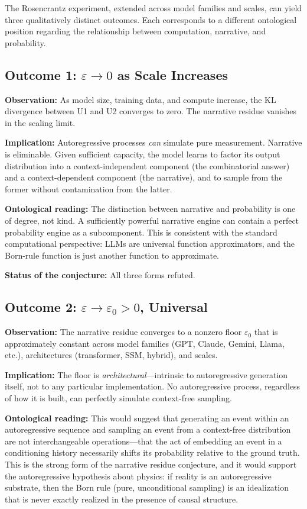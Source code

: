 \documentclass[12pt,a4paper]{article}
\theoremstyle{definition}
\theoremstyle{remark}
\begin{document}
The Rosencrantz experiment, extended across model families and scales,
can yield three qualitatively distinct outcomes.  Each corresponds to
a different ontological position regarding the relationship between
computation, narrative, and probability.

\subsection{Outcome 1: $\varepsilon \to 0$ as Scale Increases}

\textbf{Observation:} As model size, training data, and compute
increase, the KL divergence between U1 and U2 converges to zero.
The narrative residue vanishes in the scaling limit.

\textbf{Implication:} Autoregressive processes \emph{can} simulate
pure measurement.  Narrative is eliminable.  Given sufficient capacity,
the model learns to factor its output distribution into a
context-independent component (the combinatorial answer) and a
context-dependent component (the narrative), and to sample from the
former without contamination from the latter.

\textbf{Ontological reading:} The distinction between narrative and
probability is one of degree, not kind.  A sufficiently powerful
narrative engine can contain a perfect probability engine as a
subcomponent.  This is consistent with the standard computational
perspective: LLMs are universal function approximators, and the
Born-rule function is just another function to approximate.

\textbf{Status of the conjecture:} All three forms refuted.

\subsection{Outcome 2: $\varepsilon \to \varepsilon_0 > 0$, Universal}

\textbf{Observation:} The narrative residue converges to a nonzero
floor $\varepsilon_0$ that is approximately constant across model
families (GPT, Claude, Gemini, Llama, etc.), architectures
(transformer, SSM, hybrid), and scales.

\textbf{Implication:} The floor is \emph{architectural}---intrinsic
to autoregressive generation itself, not to any particular
implementation.  No autoregressive process, regardless of how it is
built, can perfectly simulate context-free sampling.

\textbf{Ontological reading:} This would suggest that generating an
event within an autoregressive sequence and sampling an event from a
context-free distribution are not interchangeable operations---that
the act of embedding an event in a conditioning history necessarily
shifts its probability relative to the ground truth.  This is the
strong form of the narrative residue conjecture, and it would
support the autoregressive hypothesis about physics: if reality is
an autoregressive substrate, then the Born rule (pure, unconditional
sampling) is an idealization that is never exactly realized
in the presence of causal structure.
\end{document}
